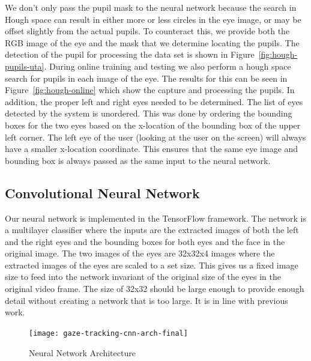 \documentclass[10pt,twocolumn,letterpaper]{article}
\begin{document}
We don't only pass the pupil mask
to the neural network because the search in Hough space can result in
either more or less circles in the eye image, or may be offset
slightly from the actual pupils. To counteract this, we provide both
the RGB image of the eye and the mask that we determine locating the
pupils. The detection of the pupil for processing the data set is shown in
Figure~\ref{fig:hough-pupils-uta}. During online training and testing
we also perform a hough space search for pupils in each image of the
eye. The results for this can be seen in Figure~\ref{fig:hough-online}
which show the capture and processing the pupils. In addition, the
proper left and right eyes needed to be determined. The list of eyes
detected by the system is unordered. This was done by
ordering the bounding boxes for the two eyes based on the x-location
of the bounding box of the upper left corner. The left eye of the user
(looking at the user on the screen) will always have a smaller
x-location coordinate. This ensures that the same eye image and
bounding box is always passed as the same input to the neural network.

\subsection{Convolutional Neural Network}
Our neural network is implemented in the TensorFlow framework. The
network is a multilayer classifier where the inputs are the extracted
images of both the left and the right eyes and the bounding boxes for
both eyes and the face in the original image. The two images of the
eyes are 32x32x4 images where the extracted images of the eyes are
scaled to a set size. This gives us a fixed image size to feed into
the network invariant of the original size of the eyes in the original
video frame. The size of 32x32 should be large enough to provide
enough detail without creating a network that is too large. It is in
line with previous work. 

\begin{figure}
  \begin{center}
    \texttt{[image: gaze-tracking-cnn-arch-final]}
  \end{center}
  \caption{Neural Network Architecture}
  \label{fig.cnn-arch}
\end{figure}
\end{document}
